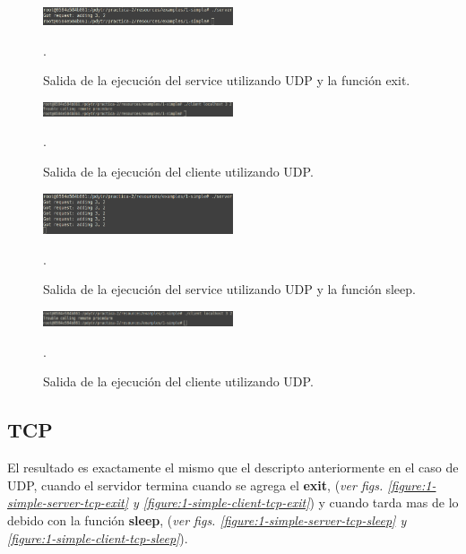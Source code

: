 \documentclass[osajnl,twocolumn,showpacs,superscriptaddress,10pt]{revtex4-1} %
\begin{document}
\begin{figure}[H]
    \centering
    \includegraphics[width=0.5\textwidth]{capturas/1-simple-server-udp-exit}
    \caption{Salida de la ejecución del service utilizando UDP y la función exit.}.
    \label{figure:1-simple-server-udp-exit}
\end{figure}

\begin{figure}[H]
    \centering
    \includegraphics[width=0.5\textwidth]{capturas/1-simple-client-udp-exit}
    \caption{Salida de la ejecución del cliente utilizando UDP.}.
    \label{figure:1-simple-client-udp-exit}
\end{figure}

\begin{figure}[H]
    \centering
    \includegraphics[width=0.5\textwidth]{capturas/1-simple-server-udp-sleep}
    \caption{Salida de la ejecución del service utilizando UDP y la función sleep.}.
    \label{figure:1-simple-server-udp-sleep}
\end{figure}

\begin{figure}[H]
    \centering
    \includegraphics[width=0.5\textwidth]{capturas/1-simple-client-udp-sleep}
    \caption{Salida de la ejecución del cliente utilizando UDP.}.
    \label{figure:1-simple-client-udp-sleep}
\end{figure}

\subsection{TCP}

El resultado es exactamente el mismo que el descripto anteriormente en el caso de UDP, cuando el servidor termina cuando se agrega el \textbf{exit}, (\textit{ver figs. \ref{figure:1-simple-server-tcp-exit} y \ref{figure:1-simple-client-tcp-exit}}) y cuando tarda mas de lo debido con la función \textbf{sleep}, (\textit{ver figs. \ref{figure:1-simple-server-tcp-sleep} y \ref{figure:1-simple-client-tcp-sleep}}).
\end{document}
